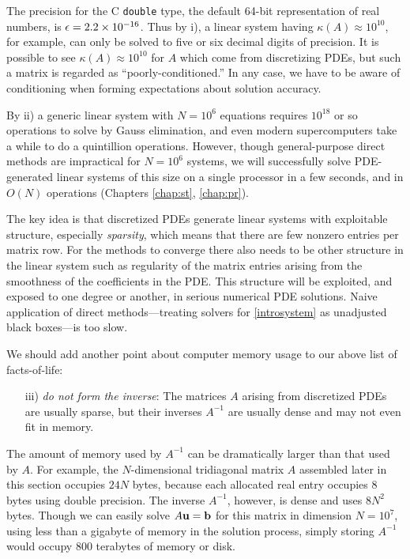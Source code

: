The precision for the C \texttt{double} type, the default 64-bit representation of real numbers, is $\epsilon = 2.2 \times 10^{-16}$.  Thus by i), a linear system having $\kappa(A) \approx 10^{10}$, for example, can only be solved to five or six decimal digits of precision.  It is possible to see $\kappa(A)\approx 10^{10}$ for $A$ which come from discretizing PDEs, but such a matrix is regarded as ``poorly-conditioned.''  In any case, we have to be aware of conditioning when forming expectations about solution accuracy.

By ii) a generic linear system with $N=10^6$ equations requires $10^{18}$ or so operations to solve by Gauss elimination, and even modern supercomputers take a while to do a quintillion operations.  However, though general-purpose direct methods are impractical for $N=10^6$ systems, we will successfully solve PDE-generated linear systems of this size on a single processor in a few seconds, and in $O(N)$ operations (Chapters \ref{chap:st}, \ref{chap:pr}).

The key idea is that discretized PDEs generate linear systems with exploitable structure, especially \emph{sparsity}, which means that there are few nonzero entries per matrix row.  For the methods to converge there also needs to be other structure in the linear system such as regularity of the matrix entries arising from the smoothness of the coefficients in the PDE.  This structure will be exploited, and exposed to one degree or another, in serious numerical PDE solutions.  Naive application of direct methods---treating solvers for \eqref{introsystem} as unadjusted black boxes---is too slow.

We should add another point about computer memory usage to our above list of facts-of-life:
\begin{enumerate}
\item[iii)] \emph{do not form the inverse}:  The matrices $A$ arising from discretized PDEs are usually sparse, but their inverses $A^{-1}$ are usually dense and may not even fit in memory.
\end{enumerate}
The amount of memory used by $A^{-1}$ can be dramatically larger than that used by $A$.  For example, the $N$-dimensional tridiagonal matrix $A$ assembled later in this section occupies $24 N$ bytes, because each allocated real entry occupies 8 bytes using double precision.  The inverse $A^{-1}$, however, is dense and uses $8 N^2$ bytes.  Though we can easily solve $A\mathbf{u}=\mathbf{b}$ for this matrix in dimension $N=10^7$, using less than a gigabyte of memory in the solution process, simply storing $A^{-1}$ would occupy $800$ terabytes of memory or disk.


